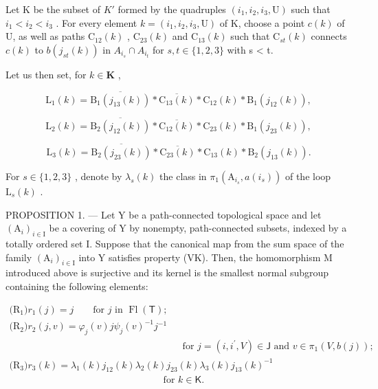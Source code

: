 Let K be the subset of \(K'\) formed by the quadruples \((i_{1}, i_{2}, i_{3}, \mathrm{U})\) such that \(i_{1} < i_{2} < i_{3}\) . For every element \(k = (i_{1}, i_{2}, i_{3}, \mathrm{U})\) of K, choose a point \(c(k)\) of U, as well as paths \(\mathrm{C}_{12}(k)\) , \(\mathrm{C}_{23}(k)\) and \(\mathrm{C}_{13}(k)\) such that \(\mathrm{C}_{st}(k)\) connects \(c(k)\) to \(b(j_{st}(k))\) in \(A_{i_{s}} \cap A_{i_{t}}\) for \(s, t \in \{1, 2, 3\}\) with s \textless{} t.

Let us then set, for \(k \in \mathbf{K}\) ,

\[
\mathrm{L} _ {1} (k) = \overline {{\mathrm{B} _ {1} (j _ {1 3} (k))}} * \overline {{\mathrm{C} _ {1 3} (k)}} * \mathrm{C} _ {1 2} (k) * \mathrm{B} _ {1} (j _ {1 2} (k)),\tag{4}
\]

\[
\mathrm{L} _ {2} (k) = \overline {{\mathrm{B} _ {2} (j _ {1 2} (k))}} * \overline {{\mathrm{C} _ {1 2} (k)}} * \mathrm{C} _ {2 3} (k) * \mathrm{B} _ {1} (j _ {2 3} (k)),
\]

\[
\mathrm{L} _ {3} (k) = \overline {{\mathrm{B} _ {2} (j _ {2 3} (k))}} * \overline {{\mathrm{C} _ {2 3} (k)}} * \mathrm{C} _ {1 3} (k) * \mathrm{B} _ {2} (j _ {1 3} (k)).
\]

For \(s \in \{1,2,3\}\) , denote by \(\lambda_s(k)\) the class in \(\pi_1(\mathrm{A}_{i_s}, a(i_s))\) of the loop \(\mathrm{L}_s(k)\) .

PROPOSITION 1. --- Let Y be a path-connected topological space and let \((\mathrm{A}_{i})_{i\in\mathrm{I}}\) be a covering of Y by nonempty, path-connected subsets, indexed by a totally ordered set I. Suppose that the canonical map from the sum space of the family \((\mathrm{A}_{i})_{i\in\mathrm{I}}\) into Y satisfies property (VK). Then, the homomorphism M introduced above is surjective and its kernel is the smallest normal subgroup containing the following elements:

\[
\begin{array}{l} \text {(R$_ {1}$)} r _ {1} (j) = j \qquad \text {for } j \text { in } \operatorname{Fl}(\mathsf {T}); \\ \text {(R$_ {2}$)} r _ {2} (j, v) = \varphi_ {j} (v) j \psi_ {j} (v) ^ {- 1} j ^ {- 1} \\ \qquad \qquad \qquad \qquad \qquad \qquad \qquad \qquad \qquad \text {for } j = (i,i^{\prime} ,V)\in \mathsf {J} \text { and } v\in\pi_{1} (V,b(j)); \\ \text {(R$_ {3}$)} r _ {3} (k) = \lambda_ {1} (k) j _ {1 2} (k) \lambda_ {2} (k) j _ {2 3} (k) \lambda_ {3} (k) j _ {1 3} (k) ^ {- 1} \\ \qquad \qquad \qquad \qquad \qquad \qquad \qquad \qquad \text {for } k\in \mathsf {K}. \end{array}
\]


